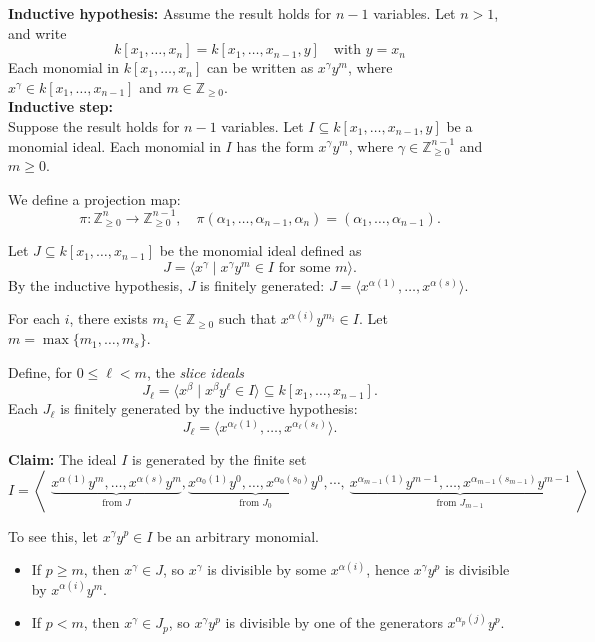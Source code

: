 \documentclass[11pt]{article}
\begin{document}
     \textbf{Inductive hypothesis:} Assume the result holds for $n - 1$ variables. Let $n > 1$, and write 
    \[
    k[x_1, \dots, x_n] = k[x_1, \dots, x_{n-1}, y] \quad \text{with $y = x_n$}
    \]
    Each monomial in $k[x_1, \dots, x_n]$ can be written as $x^\gamma y^m$, where $x^\gamma \in k[x_1, \dots, x_{n-1}]$ and $m \in \mathbb{Z}_{\geq 0}$. \\
    
    \textbf{Inductive step:} \\
Suppose the result holds for $n - 1$ variables. Let $I \subseteq k[x_1, \dots, x_{n-1}, y]$ be a monomial ideal. Each monomial in $I$ has the form $x^\gamma y^m$, where $\gamma \in \mathbb{Z}_{\geq 0}^{n-1}$ and $m \geq 0$.

We define a projection map:
\[
\pi : \mathbb{Z}_{\geq 0}^n \to \mathbb{Z}_{\geq 0}^{n-1}, \quad \pi(\alpha_1, \dots, \alpha_{n-1}, \alpha_n) = (\alpha_1, \dots, \alpha_{n-1}).
\]

Let $J \subseteq k[x_1, \dots, x_{n-1}]$ be the monomial ideal defined as
\[
J = \langle x^\gamma \mid x^\gamma y^m \in I \text{ for some } m \rangle.
\]
By the inductive hypothesis, $J$ is finitely generated: $J = \langle x^{\alpha(1)}, \dots, x^{\alpha(s)} \rangle$.

For each $i$, there exists $m_i \in \mathbb{Z}_{\geq 0}$ such that $x^{\alpha(i)} y^{m_i} \in I$. Let $m = \max \{m_1, \dots, m_s\}$.

Define, for $0 \leq \ell < m$, the \textit{slice ideals}
\[
J_\ell = \langle x^\beta \mid x^\beta y^\ell \in I \rangle \subseteq k[x_1, \dots, x_{n-1}].
\]
Each $J_\ell$ is finitely generated by the inductive hypothesis:
\[
J_\ell = \langle x^{\alpha_\ell(1)}, \dots, x^{\alpha_\ell(s_\ell)} \rangle.
\]

\textbf{Claim:} The ideal $I$ is generated by the finite set
\[
I = \left\langle
\begin{array}{l}
\underbrace{x^{\alpha(1)} y^m, \dots, x^{\alpha(s)} y^m}_{\text{from } J}, 
\underbrace{x^{\alpha_0(1)} y^0, \dots, x^{\alpha_0(s_0)} y^0}_{\text{from } J_0}, \cdots, 
\
\underbrace{x^{\alpha_{m-1}(1)} y^{m-1}, \dots, x^{\alpha_{m-1}(s_{m-1})} y^{m-1}}_{\text{from } J_{m-1}}
\end{array}
\right\rangle
\]

To see this, let $x^\gamma y^p \in I$ be an arbitrary monomial. 

\begin{itemize}
    \item If $p \geq m$, then $x^\gamma \in J$, so $x^\gamma$ is divisible by some $x^{\alpha(i)}$, hence $x^\gamma y^p$ is divisible by $x^{\alpha(i)} y^m$.
    \item If $p < m$, then $x^\gamma \in J_p$, so $x^\gamma y^p$ is divisible by one of the generators $x^{\alpha_p(j)} y^p$.
\end{itemize}
\end{document}
